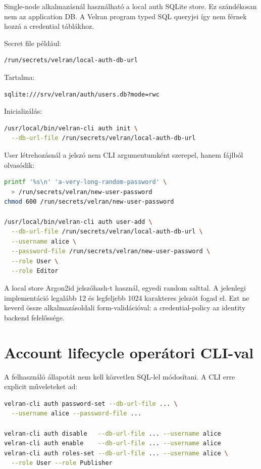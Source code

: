 Single-node alkalmazásnál használható a local auth SQLite store. Ez szándékosan nem az application DB. A Velran program typed SQL queryjei így nem férnek hozzá a credential táblákhoz.

Secret file például:

\begin{lstlisting}
/run/secrets/velran/local-auth-db-url
\end{lstlisting}

Tartalma:

\begin{lstlisting}
sqlite:///srv/velran/auth/users.db?mode=rwc
\end{lstlisting}

Inicializálás:

\begin{lstlisting}[language=bash]
/usr/local/bin/velran-cli auth init \
  --db-url-file /run/secrets/velran/local-auth-db-url
\end{lstlisting}

User létrehozásnál a jelszó nem CLI argumentumként szerepel, hanem fájlból olvasódik:

\begin{lstlisting}[language=bash]
printf '%s\n' 'a-very-long-random-password' \
  > /run/secrets/velran/new-user-password
chmod 600 /run/secrets/velran/new-user-password

/usr/local/bin/velran-cli auth user-add \
  --db-url-file /run/secrets/velran/local-auth-db-url \
  --username alice \
  --password-file /run/secrets/velran/new-user-password \
  --role User \
  --role Editor
\end{lstlisting}

A local store Argon2id jelszóhash-t használ, egyedi random salttal. A jelenlegi implementáció legalább 12 és legfeljebb 1024 karakteres jelszót fogad el. Ezt ne keverd össze alkalmazásoldali form-validációval: a credential-policy az identity backend felelőssége.

\section{Account lifecycle operátori CLI-val}

A felhasználó állapotát nem kell közvetlen SQL-lel módosítani. A CLI erre explicit műveleteket ad:

\begin{lstlisting}[language=bash]
velran-cli auth password-set --db-url-file ... \
  --username alice --password-file ...

velran-cli auth disable   --db-url-file ... --username alice
velran-cli auth enable    --db-url-file ... --username alice
velran-cli auth roles-set --db-url-file ... --username alice \
  --role User --role Publisher
\end{lstlisting}

